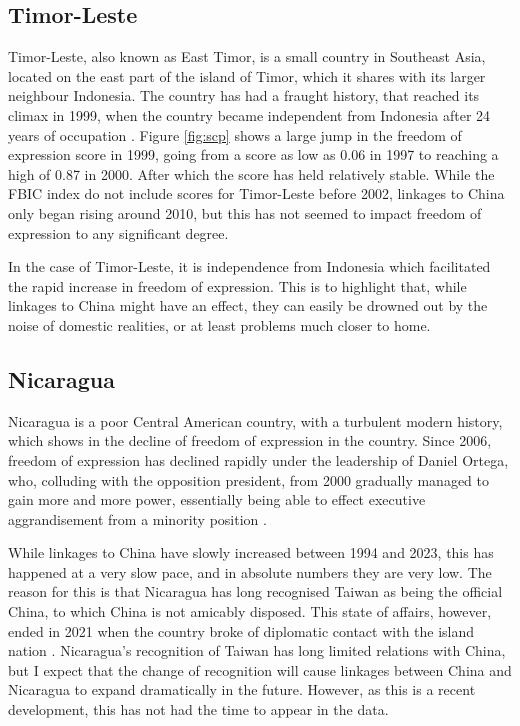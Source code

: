 \subsection{Timor-Leste}
Timor-Leste, also known as East Timor, is a small country in Southeast Asia, located on the east part of the island of Timor, which it shares with its larger neighbour Indonesia. The country has had a fraught history, that reached its climax in 1999, when the country became independent from Indonesia after 24 years of occupation \citep[p. 183]{kingsbury_democratic_2014}. Figure \ref{fig:scp} shows a large jump in the freedom of expression score in 1999, going from a score as low as 0.06 in 1997 to reaching a high of 0.87 in 2000. After which the score has held relatively stable. While the FBIC index do not include scores for Timor-Leste before 2002, linkages to China only began rising around 2010, but this has not seemed to impact freedom of expression to any significant degree.

In the case of Timor-Leste, it is independence from Indonesia which facilitated the rapid increase in freedom of expression. This is to highlight that, while linkages to China might have an effect, they can easily be drowned out by the noise of domestic realities, or at least problems much closer to home.

\subsection{Nicaragua}
Nicaragua is a poor Central American country, with a turbulent modern history, which shows in the decline of freedom of expression in the country. Since 2006, freedom of expression has declined rapidly under the leadership of Daniel Ortega, who, colluding with the opposition president, from 2000 gradually managed to gain more and more power, essentially being able to effect executive aggrandisement from a minority position \citep{mcconnell_elite_2024}.

While linkages to China have slowly increased between 1994 and 2023, this has happened at a very slow pace, and in absolute numbers they are very low. The reason for this is that Nicaragua has long recognised Taiwan as being the official China, to which China is not amicably disposed. This state of affairs, however, ended in 2021 when the country broke of diplomatic contact with the island nation \citep{bbc_nicaragua_2021}. Nicaragua's recognition of Taiwan has long limited relations with China, but I expect that the change of recognition will cause linkages between China and Nicaragua to expand dramatically in the future. However, as this is a recent development, this has not had the time to appear in the data. 

